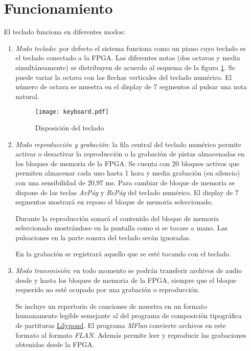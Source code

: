 \documentclass{article}
\begin{document}
\section{Funcionamiento}

	El teclado funciona en diferentes modos:

	\begin{enumerate}
		\item {\itshape Modo teclado}: por defecto el sistema funciona como un piano cuyo teclado es el teclado conectado a la FPGA. Las diferentes notas (dos octavas y media simultáneamente) se distribuyen de acuerdo al esquema de la figura \ref{fig:teclado}. Se puede variar la octava con las flechas verticales del teclado numérico. El número de octava se muestra en el display de 7 segmentos al pulsar una nota natural.

\begin{figure}[ht] \centering
	\texttt{[image: keyboard.pdf]}

	\caption{Disposición del teclado}
	\label{fig:teclado}
\end{figure}

	\item {\itshape Modo reproducción y grabación}: la fila central del teclado numérico permite activar o desactivar la reproducción o la grabación de pistas almacenadas en los bloques de memoria de la FPGA. Se cuenta con 20 bloques activos que permiten almacenar cada uno hasta 1 hora y media grabación (en silencio) con una sensibilidad de 20,97 ms. Para cambiar de bloque de memoria se dispone de las teclas {\itshape AvPág} y {\itshape RePág} del teclado numérico. El display de 7 segmentos mostrará en reposo el bloque de memoria seleccionado.

		Durante la reproducción sonará el contenido del bloque de memoria seleccionado mostrándose en la pantalla como si se tocase a mano. Las pulsaciones en la parte sonora del teclado serán ignoradas.

		En la grabación se registrará aquello que se esté tocando con el teclado.

	\item {\itshape Modo transmisión}: en todo momento se podrán transferir archivos de audio desde y hasta los bloques de memoria de la FPGA, siempre que el bloque requerido no esté ocupado por una grabación o reproducción.

		Se incluye un repertorio de canciones de muestra en un formato humanamente legible semejante al del programa de composición tipográfica de partituras \href{http://lilypond.org/}{Lilypond}. El programa {\itshape MFlan} convierte archivos en este formato al formato {\itshape FLAN}. Además permite leer y reproducir las grabaciones obtenidas desde la FPGA.


\end{enumerate}
\end{document}
